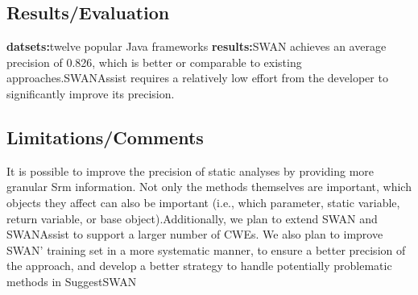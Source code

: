 \subsection{Results/Evaluation}
\textbf{datsets:}twelve popular Java frameworks
\textbf{results:}SWAN achieves an average precision of 0.826, which is better or comparable to existing approaches.SWANAssist requires a relatively low effort from the developer to significantly improve its precision.

\subsection{Limitations/Comments}
It is possible to improve the precision of static analyses by providing more granular Srm information. Not only the methods themselves are important, which objects they affect can also be important
(i.e., which parameter, static variable, return variable, or base object).Additionally, we plan to extend SWAN and SWANAssist to support a larger number of CWEs. We also plan to improve SWAN’ training set in a more systematic manner, to ensure a better precision of the approach, and develop a better strategy to handle potentially problematic methods in SuggestSWAN
\newpage

